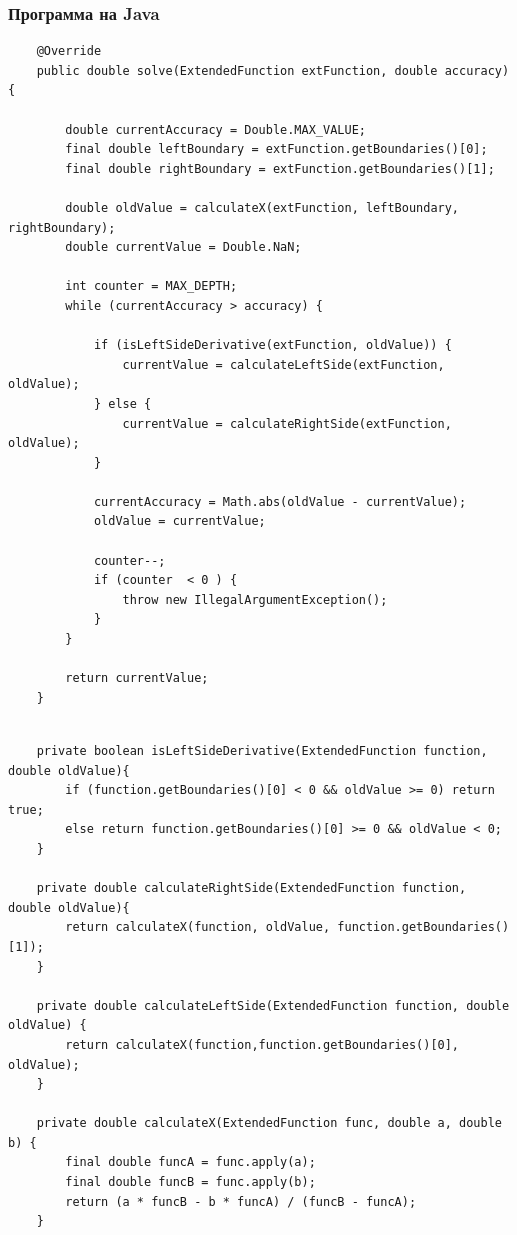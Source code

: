 \documentclass[11pt, english]{article}
\begin{document}
\subsubsection{Программа на Java}
\begin{center}
    \begin{lstlisting}
    @Override
    public double solve(ExtendedFunction extFunction, double accuracy) {

        double currentAccuracy = Double.MAX_VALUE;
        final double leftBoundary = extFunction.getBoundaries()[0];
        final double rightBoundary = extFunction.getBoundaries()[1];

        double oldValue = calculateX(extFunction, leftBoundary, rightBoundary);
        double currentValue = Double.NaN;

        int counter = MAX_DEPTH;
        while (currentAccuracy > accuracy) {

            if (isLeftSideDerivative(extFunction, oldValue)) {
                currentValue = calculateLeftSide(extFunction, oldValue);
            } else {
                currentValue = calculateRightSide(extFunction, oldValue);
            }

            currentAccuracy = Math.abs(oldValue - currentValue);
            oldValue = currentValue;

            counter--;
            if (counter  < 0 ) {
                throw new IllegalArgumentException();
            }
        }

        return currentValue;
    }

    \end{lstlisting}
\end{center}
\newpage
\begin{center}
    \begin{lstlisting}
        
    private boolean isLeftSideDerivative(ExtendedFunction function, double oldValue){
        if (function.getBoundaries()[0] < 0 && oldValue >= 0) return true;
        else return function.getBoundaries()[0] >= 0 && oldValue < 0;
    }

    private double calculateRightSide(ExtendedFunction function, double oldValue){
        return calculateX(function, oldValue, function.getBoundaries()[1]);
    }

    private double calculateLeftSide(ExtendedFunction function, double oldValue) {
        return calculateX(function,function.getBoundaries()[0], oldValue);
    }

    private double calculateX(ExtendedFunction func, double a, double b) {
        final double funcA = func.apply(a);
        final double funcB = func.apply(b);
        return (a * funcB - b * funcA) / (funcB - funcA);
    }
    \end{lstlisting}
\end{center}
\newpage
\end{document}
